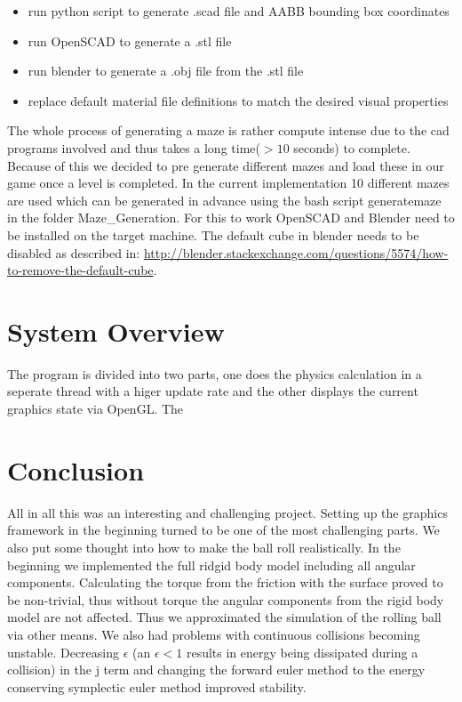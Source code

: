 \documentclass[11pt,a4paper]{article}
\begin{document}
\begin{itemize}
	\item run python script to generate .scad file and AABB bounding box coordinates
	\item run OpenSCAD to generate a .stl file
	\item run blender to generate a .obj file from the .stl file
	\item replace default material file definitions to match the desired visual properties
\end{itemize}

The whole process of generating a maze is rather compute intense due to the cad programs involved and thus takes a long time($>10$ seconds) to complete. Because of this we decided to pre generate different mazes and load these in our game once a level is completed. In the current implementation 10 different mazes are used which can be generated in advance using the bash script generatemaze in the folder Maze\_Generation. For this to work OpenSCAD and Blender need to be installed on the target machine. The default cube in blender needs to be disabled as described in: \url{http://blender.stackexchange.com/questions/5574/how-to-remove-the-default-cube}.


\section{System Overview}
\label{sec:systemOverview}
The program is divided into two parts, one does the physics calculation in a seperate thread with a higer update rate and the other displays the current graphics state via OpenGL. The 

\section{Conclusion}
\label{sec:conclusion}
All in all this was an interesting and challenging project. Setting up the graphics framework in the beginning turned to be one of the most challenging parts. We also put some thought into how to make the ball roll realistically. In the beginning we implemented the full ridgid body model including all angular components. Calculating the torque from the friction with the surface proved to be non-trivial, thus without torque the angular components from the rigid body model are not affected. Thus we approximated the simulation of the rolling ball via other means. We also had problems with continuous collisions becoming unstable. Decreasing $\epsilon$ (an $\epsilon < 1$ results in energy being dissipated during a collision) in the j term and changing the forward euler method to the energy conserving symplectic euler method improved stability.
\newpage


\end{document}
